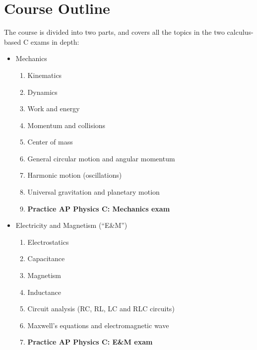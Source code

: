 \documentclass{../../oss-handout}
\begin{document}
\section*{Course Outline}
The course is divided into two parts, and covers all the topics in the two
calculus-based C exams in depth:
\begin{itemize}[noitemsep,topsep=0pt,leftmargin=15pt]
\item Mechanics
  \begin{enumerate}[noitemsep,topsep=0pt,leftmargin=18pt]
  \item Kinematics
  \item Dynamics
  \item Work and energy
  \item Momentum and collisions
  \item Center of mass
  \item General circular motion and angular momentum
  \item Harmonic motion (oscillations)
  \item Universal gravitation and planetary motion
  \item\textbf{Practice AP Physics C: Mechanics exam}
  \end{enumerate}
\item Electricity and Magnetism (``E\&M'')
  \begin{enumerate}[noitemsep,topsep=0pt,leftmargin=18pt,resume]
  \item Electrostatics
  \item Capacitance
  \item Magnetism
  \item Inductance
  \item Circuit analysis (RC, RL, LC and RLC circuits)
  \item Maxwell's equations and electromagnetic wave
  \item\textbf{Practice AP Physics C: E\&M exam}
  \end{enumerate}
\end{itemize}
\end{document}
